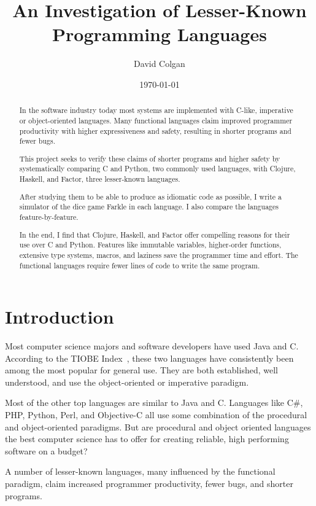 \documentclass{article}
\title{An Investigation of Lesser-Known Programming Languages}
\author{David Colgan}
\date{\today}
\begin{document}
\maketitle

\tableofcontents

\begin{abstract}

In the software industry today most systems are implemented with C-like,
imperative or object-oriented languages.  Many functional languages claim
improved programmer productivity with higher expressiveness and safety,
resulting in shorter programs and fewer bugs.

This project seeks to verify these claims of shorter programs and
higher safety by systematically comparing C and Python, two commonly used
languages, with Clojure, Haskell, and Factor, three lesser-known languages.

After studying them to be able to produce as idiomatic code as possible, I
write a simulator of the dice game Farkle in each language.  I also compare the
languages feature-by-feature.

In the end, I find that Clojure, Haskell, and Factor offer compelling reasons
for their use over C and Python.  Features like immutable variables,
higher-order functions, extensive type systems, macros, and laziness save the
programmer time and effort.  The functional languages require fewer lines of
code to write the same program.

\end{abstract}

\section{Introduction}

Most computer science majors and software developers have used Java and C.
According to the TIOBE Index~\cite{tiobe}, these two languages have
consistently been among the most popular for general use.  They are both
established, well understood, and use the object-oriented or imperative
paradigm.

Most of the other top languages are similar to Java and C.  Languages
like C\#, PHP, Python, Perl, and Objective-C all use some combination of the
procedural and object-oriented paradigms.   But are procedural and object
oriented languages the best computer science has to offer for creating
reliable, high performing software on a budget?

A number of lesser-known languages, many influenced by the functional
paradigm, claim increased programmer productivity, fewer bugs, and shorter
programs.
\end{document}
